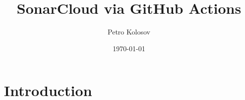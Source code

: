\documentclass[12pt,letterpaper,oneside,reqno]{amsart}
\title[SonarCloud via GitHub Actions]
{SonarCloud via GitHub Actions}
\author[Petro Kolosov]{Petro Kolosov}
\date{\today}
\numberwithin{equation}{section}
\begin{document}
    \begin{abstract}
        
    \end{abstract}

    \maketitle

    \tableofcontents


    \section{Introduction} \label{sec:introduction}
    
\end{document}
